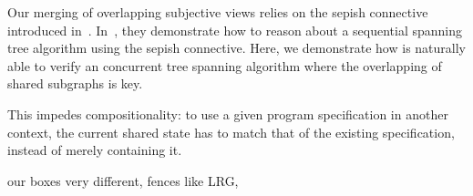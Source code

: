 Our merging of overlapping subjective views relies on the
sepish connective introduced in~\cite{reynolds,gareth,jules}. 
In~\cite{jules}, they demonstrate how to reason about a sequential
spanning tree algorithm using the sepish connective. Here, we
demonstrate
how \colosl is naturally able to verify an concurrent tree spanning
algorithm where the 
overlapping of shared subgraphs is key. 



This impedes
compositionality: to use a given program specification in another
context, the current shared state has to match that of the existing
specification, instead of merely containing it. 

our boxes very different,  fences like LRG, 




